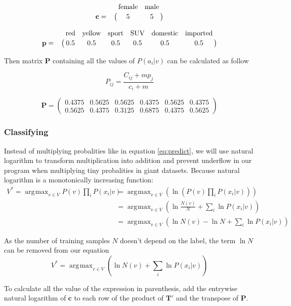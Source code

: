 \documentclass[a4paper]{article}
\newcommand{\matr}[1]{\mathbf{#1}}
\renewcommand{\vec}[1]{\mathbf{#1}}
\DeclareMathOperator*{\argmax}{\arg\!\max}
\begin{document}
			\[
				\vec{c} = \bordermatrix{~&\text{female}&\text{male} \cr
				                        ~&5 & 5 \cr}
			\]

			\[
				\vec{p} = \bordermatrix{
				~&\text{red}&\text{yellow}&\text{sport}&\text{SUV}&\text{domestic}&\text{imported} \cr
				~&0.5&0.5&0.5&0.5&0.5&0.5 \cr}
				\]

				Then matrix $\matr{P}$ containing all the values of $P(a_i|v)$ can be
				calculated as follow

			\begin{equation}
				\label{eq:alprob}
				P_{ij} = \frac{C_{ij} + m p_j}{c_i + m}
			\end{equation}

			\[\matr{P} =
				\begin{pmatrix}
					0.4375 & 0.5625 & 0.5625 & 0.4375 & 0.5625 & 0.4375 \\
					0.5625 & 0.4375 & 0.3125 & 0.6875 & 0.4375 & 0.5625
				\end{pmatrix}
			\]

		\subsubsection{Classifying}
			Instead of multiplying probalities like in
			equation \eqref{eq:predict}, we will
			use natural logarithm to transform multiplication into addition and
			prevent underflow in our program when multiplying tiny probalities in
			giant datasets. Because natural logarithm is a monotonically increasing
			function:
			\begin{align*}
				V^* = \argmax_{v \in V} P(v) \prod_i{P(x_i | v)}
						&= \argmax_{v \in V}\left(\ln\left(P(v) \prod_i{P(x_i |
						v)}\right)\right) \\
						&= \argmax_{v \in V}\left(\ln \frac{N(v)}{N} + \sum_i{\ln P(x_i
						| v)}\right) \\
						&= \argmax_{v \in V}\left(\ln N(v) - \ln N + \sum_i{\ln P(x_i
						| v)}\right)
			\end{align*}
			
			As the number of training samples $N$ doesn't depend on the label, the
			term $\ln N$ can be removed from our equation
			\[V^* = \argmax_{v \in V}\left(\ln N(v) + \sum_i{\ln P(x_i|v)}\right)\]


			To calculate all the value of the expression in parenthesis, add the
			entrywise natural logarithm of $\vec{c}$ to each row of the product of
			$\matr{T'}$ and the transpose of $\matr{P}$.
			
\end{document}
